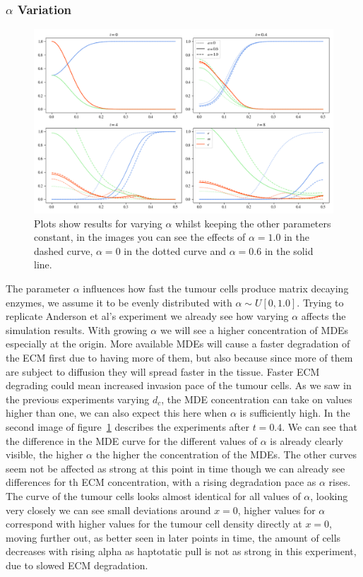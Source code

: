 \subsubsection*{$\alpha$ Variation}
\begin{figure}[h]
    \centering
    \includegraphics[width=\textwidth]{resources/images/alpha_variation.png}
    \caption{Plots show results for varying $\alpha$ whilst keeping the other parameters constant, in the images you can see the effects of $\alpha=1.0$ in the dashed curve, $\alpha=0$ in the dotted curve and $\alpha=0.6$ in the solid line.}
    \label{fig:alpha_variation}
\end{figure}
The parameter $\alpha$ influences how fast the tumour cells produce matrix decaying enzymes, we assume it to be evenly distributed with $\alpha \sim U[0, 1.0]$. Trying to replicate Anderson et al's experiment we already see how varying $\alpha$ affects the simulation results. With growing $\alpha$ we will see a higher concentration of MDEs especially at the origin. More available MDEs will cause a faster degradation of the ECM first due to having more of them, but also because since more of them are subject to diffusion they will spread faster in the tissue. Faster ECM degrading could mean increased invasion pace of the tumour cells. As we saw in the previous experiments varying $d_c$, the MDE concentration can take on values higher than one, we can also expect this here when $\alpha$ is sufficiently high. \newline 
In the second image of figure~\ref{fig:alpha_variation} describes the experiments after $t=0.4$. We can see that the difference in the MDE curve for the different values of $\alpha$ is already clearly visible, the higher $\alpha$ the higher the concentration of the MDEs. The other curves seem not be affected as strong at this point in time though we can already see differences for th ECM concentration, with a rising degradation pace as $\alpha$ rises. The curve of the tumour cells looks almost identical for all values of $\alpha$, looking very closely we can see small deviations around $x=0$, higher values for $\alpha$ correspond with higher values for the tumour cell density directly at $x=0$, moving further out, as better seen in later points in time, the amount of cells decreases with rising alpha as haptotatic pull is not as strong in this experiment, due to slowed ECM degradation. \newline 
